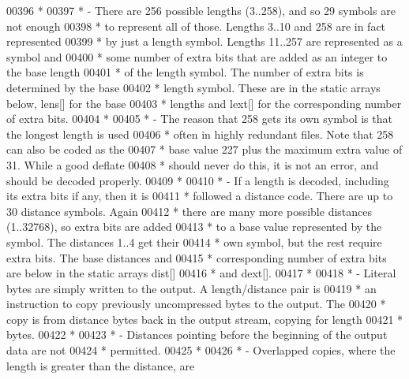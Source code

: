 \begin{DoxyCode}
00396 \textcolor{comment}{ *}
00397 \textcolor{comment}{ * - There are 256 possible lengths (3..258), and so 29 symbols are not enough}
00398 \textcolor{comment}{ *   to represent all of those.  Lengths 3..10 and 258 are in fact represented}
00399 \textcolor{comment}{ *   by just a length symbol.  Lengths 11..257 are represented as a symbol and}
00400 \textcolor{comment}{ *   some number of extra bits that are added as an integer to the base length}
00401 \textcolor{comment}{ *   of the length symbol.  The number of extra bits is determined by the base}
00402 \textcolor{comment}{ *   length symbol.  These are in the static arrays below, lens[] for the base}
00403 \textcolor{comment}{ *   lengths and lext[] for the corresponding number of extra bits.}
00404 \textcolor{comment}{ *}
00405 \textcolor{comment}{ * - The reason that 258 gets its own symbol is that the longest length is used}
00406 \textcolor{comment}{ *   often in highly redundant files.  Note that 258 can also be coded as the}
00407 \textcolor{comment}{ *   base value 227 plus the maximum extra value of 31.  While a good deflate}
00408 \textcolor{comment}{ *   should never do this, it is not an error, and should be decoded properly.}
00409 \textcolor{comment}{ *}
00410 \textcolor{comment}{ * - If a length is decoded, including its extra bits if any, then it is}
00411 \textcolor{comment}{ *   followed a distance code.  There are up to 30 distance symbols.  Again}
00412 \textcolor{comment}{ *   there are many more possible distances (1..32768), so extra bits are added}
00413 \textcolor{comment}{ *   to a base value represented by the symbol.  The distances 1..4 get their}
00414 \textcolor{comment}{ *   own symbol, but the rest require extra bits.  The base distances and}
00415 \textcolor{comment}{ *   corresponding number of extra bits are below in the static arrays dist[]}
00416 \textcolor{comment}{ *   and dext[].}
00417 \textcolor{comment}{ *}
00418 \textcolor{comment}{ * - Literal bytes are simply written to the output.  A length/distance pair is}
00419 \textcolor{comment}{ *   an instruction to copy previously uncompressed bytes to the output.  The}
00420 \textcolor{comment}{ *   copy is from distance bytes back in the output stream, copying for length}
00421 \textcolor{comment}{ *   bytes.}
00422 \textcolor{comment}{ *}
00423 \textcolor{comment}{ * - Distances pointing before the beginning of the output data are not}
00424 \textcolor{comment}{ *   permitted.}
00425 \textcolor{comment}{ *}
00426 \textcolor{comment}{ * - Overlapped copies, where the length is greater than the distance, are}

\end{DoxyCode}
